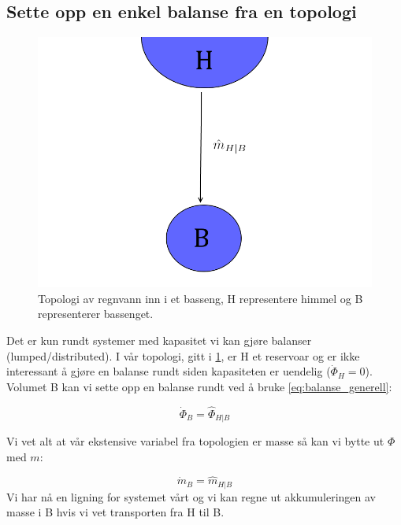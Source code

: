 \subsection{Sette opp en enkel balanse fra en topologi} \label{sec:balanse_enkel}

\begin{figure}[H]
    \centering
    \includegraphics[scale=0.3]{Figures/Basseng1.png}
    \caption{Topologi av regnvann inn i et basseng, H representere himmel og B representerer bassenget.}
    \label{fig:topologi_enkel2}
\end{figure}
Det er kun rundt systemer med kapasitet vi kan gjøre balanser (lumped/distributed). I vår topologi, gitt i \cref{fig:topologi_enkel2}, er H et reservoar og er ikke interessant å gjøre en balanse rundt siden kapasiteten er uendelig ($\dot{\Phi}_H=0$). Volumet B kan vi sette opp en balanse rundt ved å bruke \cref{eq:balanse_generell}:

\begin{equation}
    \dot{\Phi}_{B} = \hat{\Phi}_{H|B}
\end{equation}

Vi vet alt at vår ekstensive variabel fra topologien er masse så kan vi bytte ut $\Phi$ med $m$:


\begin{equation}
    \dot{m}_B = \hat{m}_{H|B}    
\end{equation}
Vi har nå en ligning for systemet vårt og vi kan regne ut akkumuleringen av masse i B hvis vi vet transporten fra H til B. 

